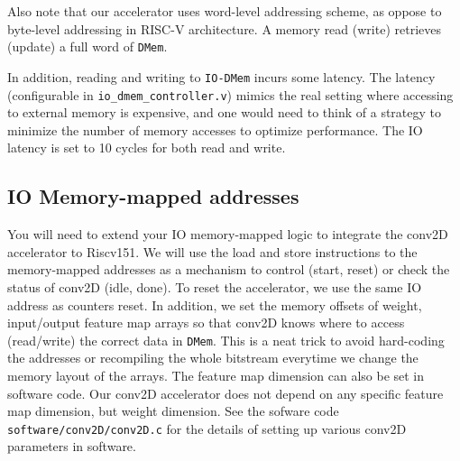 \documentclass[11pt]{article}
\begin{document}
Also note that our accelerator uses word-level addressing scheme, as oppose to byte-level addressing in RISC-V architecture. A memory read (write) retrieves (update) a full word of \texttt{DMem}.

In addition, reading and writing to \texttt{IO-DMem} incurs some latency. The latency (configurable in \verb|io_dmem_controller.v|) mimics the real setting where accessing to external memory is expensive, and one would need to think of a strategy to minimize the number of memory accesses to optimize performance. The IO latency is set to 10 cycles for both read and write.

\subsection{IO Memory-mapped addresses}

You will need to extend your IO memory-mapped logic to integrate the conv2D accelerator to Riscv151. We will use the load and store instructions to the memory-mapped addresses as a mechanism to control (start, reset) or check the status of conv2D (idle, done). To reset the accelerator, we use the same IO address as counters reset. In addition, we set the memory offsets of weight, input/output feature map arrays so that conv2D knows where to access (read/write) the correct data in \texttt{DMem}. This is a neat trick to avoid hard-coding the addresses or recompiling the whole bitstream everytime we change the memory layout of the arrays. The feature map dimension can also be set in software code. Our conv2D accelerator does not depend on any specific feature map dimension, but weight dimension. See the sofware code \verb|software/conv2D/conv2D.c| for the details of setting up various conv2D parameters in software.
\end{document}
